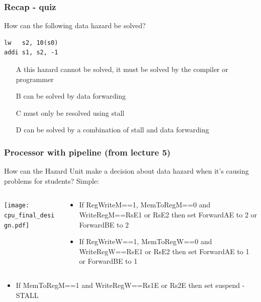 \documentclass{beamer}
\begin{document}
\begin{frame}[fragile]
\frametitle{Recap - quiz}

How can the following data hazard be solved?

\begin{verbatim}
lw   s2, 10(s0)
addi s1, s2, -1
\end{verbatim}
\bigskip
\begin{itemize}
 \item[A] this hazard cannot be solved, it must be solved by the compiler or programmer
 \item[B] can be solved by data forwarding
 \item[C] must only be resolved using stall
 \item[D] can be solved by a combination of stall and data forwarding
\end{itemize}

\end{frame}


\begin{frame}

\frametitle{Processor with pipeline (from lecture 5)}

How can the Hazard Unit make a decision about data hazard when it's causing problems for students? Simple:
\begin{columns}
\begin{column}{0.67\textwidth}
\texttt{[image: cpu\_final\_design.pdf]}
\end{column}
\begin{column}{0.33\textwidth}
\footnotesize
\begin{itemize}
\item If RegWriteM==1, MemToRegM==0 and WriteRegM==RsE1 or RsE2 then set ForwardAE to 2 or ForwardBE to 2
\item If RegWriteW==1, MemToRegW==0 and WriteRegW==RsE1 or RsE2 then set ForwardAE to 1 or ForwardBE to 1
\end{itemize}
\end{column}
\end{columns}
\bigskip
\footnotesize
\begin{itemize}
\item If MemToRegM==1 and WriteRegW==Rs1E or Rs2E then set suspend - STALL
\end{itemize}
\end{frame}
\end{document}
